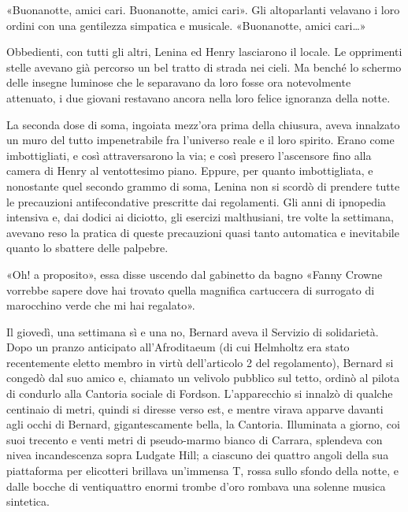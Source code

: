 \documentclass[
a5paper, %
10pt, %
twoside, 
onecolumn, %
openany, %
]{memoir}
\begin{document}
«Buonanotte, amici cari. Buonanotte, amici cari». Gli altoparlanti velavano i loro ordini con una gentilezza simpatica e musicale. «Buonanotte, amici cari…»

Obbedienti, con tutti gli altri, Lenina ed Henry lasciarono il locale. Le opprimenti stelle avevano già percorso un bel tratto di strada nei cieli. Ma benché lo schermo delle insegne luminose che le separavano da loro fosse ora notevolmente attenuato, i due giovani restavano ancora nella loro felice ignoranza della notte.

La seconda dose di soma, ingoiata mezz’ora prima della chiusura, aveva innalzato un muro del tutto impenetrabile fra l’universo reale e il loro spirito. Erano come imbottigliati, e così attraversarono la via; e così presero l’ascensore fino alla camera di Henry al ventottesimo piano. Eppure, per quanto imbottigliata, e nonostante quel secondo grammo di soma, Lenina non si scordò di prendere tutte le precauzioni antifecondative prescritte dai regolamenti. Gli anni di ipnopedia intensiva e, dai dodici ai diciotto, gli esercizi malthusiani, tre volte la settimana, avevano reso la pratica di queste precauzioni quasi tanto automatica e inevitabile quanto lo sbattere delle palpebre.

«Oh! a proposito», essa disse uscendo dal gabinetto da bagno «Fanny Crowne vorrebbe sapere dove hai trovato quella magnifica cartuccera di surrogato di marocchino verde che mi hai regalato».

\newpage

\begin{center}
    {\huge\textbf{}}
\end{center}

Il giovedì, una settimana sì e una no, Bernard aveva il Servizio di solidarietà. Dopo un pranzo anticipato all’Afroditaeum (di cui Helmholtz era stato recentemente eletto membro in virtù dell’articolo 2 del regolamento), Bernard si congedò dal suo amico e, chiamato un velivolo pubblico sul tetto, ordinò al pilota di condurlo alla Cantoria sociale di Fordson. L’apparecchio si innalzò di qualche centinaio di metri, quindi si diresse verso est, e mentre virava apparve davanti agli occhi di Bernard, gigantescamente bella, la Cantoria. Illuminata a giorno, coi suoi trecento e venti metri di pseudo-marmo bianco di Carrara, splendeva con nivea incandescenza sopra Ludgate Hill; a ciascuno dei quattro angoli della sua piattaforma per elicotteri brillava un’immensa T, rossa sullo sfondo della notte, e dalle bocche di ventiquattro enormi trombe d’oro rombava una solenne musica sintetica.
\end{document}
